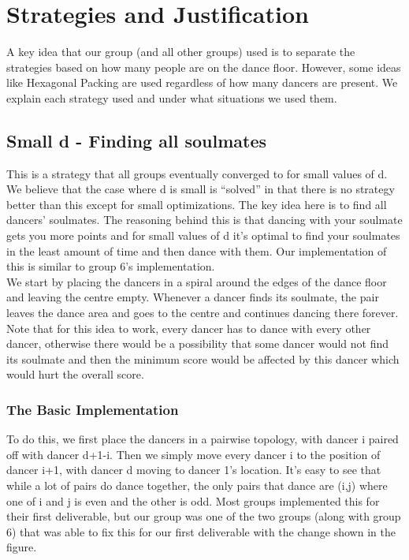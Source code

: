 \section{Strategies and Justification}
A key idea that our group (and all other groups) used is to separate the strategies based on how many people are on the dance floor. However, some ideas like Hexagonal Packing are used regardless of how many dancers are present. We explain each strategy used and under what situations we used them.
\subsection{Small d - Finding all soulmates}
This is a strategy that all groups eventually converged to for small values of d. We believe that the case where d is small is “solved” in that there is no strategy better than this except for small optimizations. The key idea here is to find all dancers' soulmates. The reasoning behind this is that dancing with your soulmate gets you more points and for small values of d it's optimal to find your soulmates in the least amount of time and then dance with them. Our implementation of this is similar to group 6's implementation.\\
We start by placing the dancers in a spiral around the edges of the dance floor and leaving the centre empty. Whenever a dancer finds its soulmate, the pair leaves the dance area and goes to the centre and continues dancing there forever. \\
Note that for this idea to work, every dancer has to dance with every other dancer, otherwise there would be a possibility that some dancer would not find its soulmate and then the minimum score would be affected by this dancer which would hurt the overall score. \\
\subsubsection{The Basic Implementation}
To do this, we first place the dancers in a pairwise topology, with dancer i paired off with dancer d+1-i. Then we simply move every dancer i to the position of dancer i+1, with dancer d moving to dancer 1's location. It's easy to see that while a lot of pairs do dance together, the only pairs that dance are (i,j) where one of i and j is even and the other is odd. Most groups implemented this for their first deliverable, but our group was one of the two groups (along with group 6) that was able to fix this for our first deliverable with the change shown in the figure.\\
